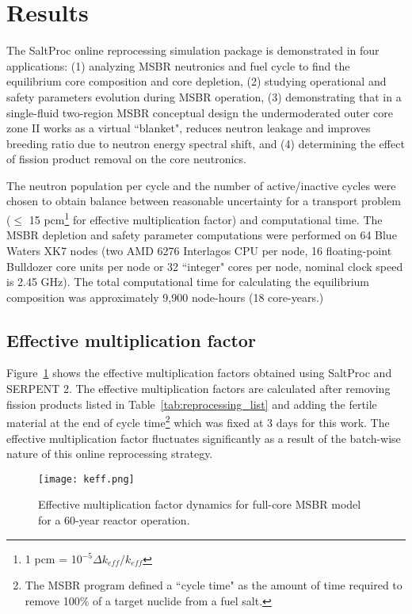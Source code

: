 \section{Results}
The SaltProc online reprocessing simulation package is demonstrated in four 
applications: (1) analyzing  \gls{MSBR} neutronics and fuel cycle to find the 
equilibrium core composition and core depletion, (2) studying operational and 
safety parameters evolution during \gls{MSBR} operation, (3) demonstrating that 
in a single-fluid two-region \gls{MSBR} conceptual design the undermoderated 
outer core zone II works as a virtual ``blanket", reduces neutron leakage and 
improves breeding ratio due to neutron energy spectral shift, and (4) 
determining the effect of fission product removal on the core neutronics.

The neutron population per cycle and the number of active/inactive cycles were 
chosen to obtain balance between reasonable uncertainty for a transport problem 
($\leq$ 15 pcm\footnote{ 1 pcm = 10$^{-5}\Delta k_{eff}/k_{eff}$} for effective 
multiplication factor) and computational time. The \gls{MSBR} depletion and 
safety parameter computations were performed on 64 Blue Waters XK7 nodes (two 
AMD 6276 Interlagos CPU per node, 16 floating-point Bulldozer core units per 
node or 32 ``integer" cores per node, nominal clock speed is 2.45 GHz). The 
total computational time for calculating the equilibrium composition was 
approximately 9,900 node-hours (18 core-years.)

\subsection{Effective multiplication factor}
Figure~\ref{fig:keff} shows the effective multiplication factors 
obtained using SaltProc and SERPENT 2. The effective multiplication factors are 
calculated after removing fission products listed in 
Table~\ref{tab:reprocessing_list} and adding the fertile material at the end of 
cycle time\footnote{ The \gls{MSBR} program defined a ``cycle time" as the 
        amount of time required to remove 100\% of a target nuclide from a fuel 
salt.} which was fixed at 3 days for this work. The effective multiplication 
factor fluctuates significantly as a result of the batch-wise nature of this 
online reprocessing strategy. 

\begin{figure}[ht!] 
  \centering
  \texttt{[image: keff.png]}
  \caption{Effective multiplication factor dynamics for full-core \gls{MSBR} 
  model for a 60-year reactor operation.}
  \label{fig:keff}
\end{figure}

